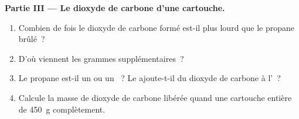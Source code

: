 \begin{problem}
\medskip
\noindent\textbf{Partie III --- Le dioxyde de carbone d'une cartouche.}
\begin{enumerate}[resume]
  \item Combien de fois le dioxyde de carbone formé est-il plus lourd que
        le propane brûlé~?
  \item D'où viennent les grammes supplémentaires~?
  \item Le propane est-il un  ou un ~? Le  ajoute-t-il du dioxyde de carbone à
        l'~?
  \item Calcule la masse de dioxyde de carbone libérée quand une
        cartouche entière de \qty{450}{g}  complètement.
\end{enumerate}
\end{problem}
